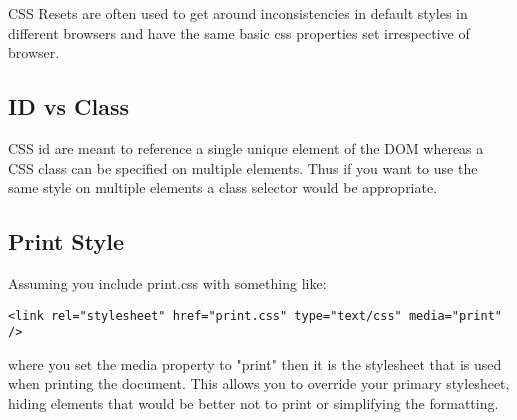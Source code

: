 \documentclass[12pt]{amsart}
\begin{document}
CSS Resets are often used to get around inconsistencies in default styles in different browsers and have the same basic css properties set irrespective of browser.

\subsection{ID vs Class}
 CSS id are meant to reference a single unique element of the DOM whereas a CSS class can be specified on multiple elements. Thus if you want to use the same style on multiple elements a class selector would be appropriate.

\subsection{Print Style}
Assuming you include print.css with something like:
\begin{verbatim}
<link rel="stylesheet" href="print.css" type="text/css" media="print" /> 
\end{verbatim}
where you set the media property to "print" then it is the stylesheet that is used when printing the document. This allows you to override your primary stylesheet, hiding elements that would be better not to print or simplifying the formatting.
\end{document}
